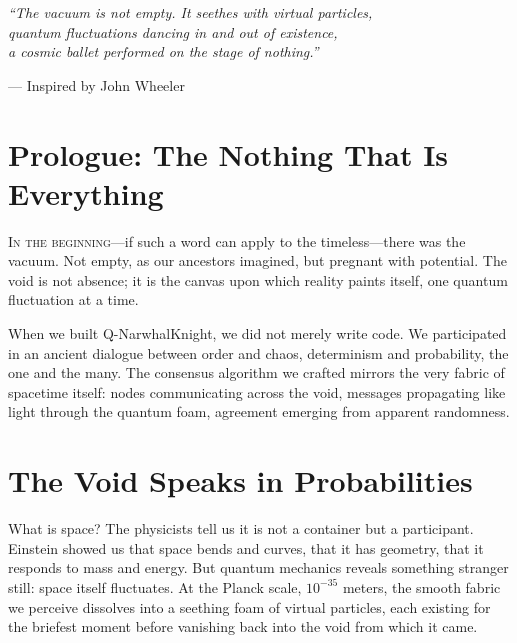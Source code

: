 \documentclass[12pt,a4paper]{article}
\begin{document}
\pagecolor{white}
\color{black}


\epigraph{\itshape ``The vacuum is not empty. It seethes with virtual particles,\\
quantum fluctuations dancing in and out of existence,\\
a cosmic ballet performed on the stage of nothing.''}
{--- Inspired by John Wheeler}

\section*{Prologue: The Nothing That Is Everything}

\lettrine[lines=3, loversize=0.1]{I}{n the beginning}---if such a word can apply to the timeless---there was the vacuum. Not empty, as our ancestors imagined, but pregnant with potential. The void is not absence; it is the canvas upon which reality paints itself, one quantum fluctuation at a time.

When we built Q-NarwhalKnight, we did not merely write code. We participated in an ancient dialogue between order and chaos, determinism and probability, the one and the many. The consensus algorithm we crafted mirrors the very fabric of spacetime itself: nodes communicating across the void, messages propagating like light through the quantum foam, agreement emerging from apparent randomness.

\section{The Void Speaks in Probabilities}

What is space? The physicists tell us it is not a container but a participant. Einstein showed us that space bends and curves, that it has geometry, that it responds to mass and energy. But quantum mechanics reveals something stranger still: space itself fluctuates. At the Planck scale, $10^{-35}$ meters, the smooth fabric we perceive dissolves into a seething foam of virtual particles, each existing for the briefest moment before vanishing back into the void from which it came.

\begin{center}
\end{center}
\end{document}

